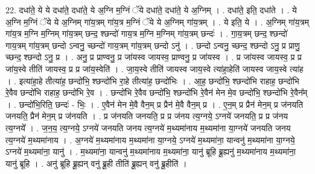 \documentclass[17pt]{extarticle}
\begin{document}
22. दधा॑ते॒ ये ये दधा॑ते॒ दधा॑ते॒ ये अ॒ग्नि म॒ग्निं ॅये दधा॑ते॒ दधा॑ते॒ ये अ॒ग्निम् । . दधा॑ते॒ इति॒ दधा॑ते । . ये अ॒ग्नि म॒ग्निं ॅये ये अ॒ग्निम् गा॑य॒त्रम् गा॑य॒त्र म॒ग्निं ॅये ये अ॒ग्निम् गा॑य॒त्रम् । . ये इति॒ ये । . अ॒ग्निम् गा॑य॒त्रम् गा॑य॒त्र म॒ग्नि म॒ग्निम् गा॑य॒त्रम् छन्द॒ श्छन्दो॑ गाय॒त्र म॒ग्नि म॒ग्निम् गा॑य॒त्रम् छन्दः॑ । . गा॒य॒त्रम् छन्द॒ श्छन्दो॑ गाय॒त्रम् गा॑य॒त्रम् छन्दो ऽन्वनु॒ च्छन्दो॑ गाय॒त्रम् गा॑य॒त्रम् छन्दो ऽनु॑ । . छन्दो ऽन्वनु॒ च्छन्द॒ श्छन्दो ऽनु॒ प्र प्राणु॒ च्छन्द॒ श्छन्दो ऽनु॒ प्र । . अनु॒ प्र प्राण्वनु॒ प्र जा॑यस्व जायस्व॒ प्राण्वनु॒ प्र जा॑यस्व । . प्र जा॑यस्व जायस्व॒ प्र प्र जा॑य॒स्वे तीति॑ जायस्व॒ प्र प्र जा॑य॒स्वेति॑ । . जा॒य॒स्वे तीति॑ जायस्व जाय॒स्वे त्या॑हा॒हेति॑ जायस्व जाय॒स्वे त्या॑ह । . इत्या॑हा॒हे तीत्या॑ह॒ छन्दो॑भि॒ श्छन्दो॑भि रा॒हे तीत्या॑ह॒ छन्दो॑भिः । . आ॒ह॒ छन्दो॑भि॒ श्छन्दो॑भि राहाह॒ छन्दो॑भि रे॒वैव छन्दो॑भि राहाह॒ छन्दो॑भि रे॒व । . छन्दो॑भि रे॒वैव छन्दो॑भि॒ श्छन्दो॑भि रे॒वैन॑ मेन मे॒व छन्दो॑भि॒ श्छन्दो॑भि रे॒वैन᳚म् । . छन्दो॑भि॒रिति॒ छन्दः॑ - भिः॒ । . ए॒वैन॑ मेन मे॒वै वैन॒म् प्र प्रैन॑ मे॒वै वैन॒म् प्र । . ए॒न॒म् प्र प्रैन॑ मेन॒म् प्र ज॑नयति जनयति॒ प्रैन॑ मेन॒म् प्र ज॑नयति । . प्र ज॑नयति जनयति॒ प्र प्र ज॑नय त्य॒ग्नये॒ ऽग्नये॑ जनयति॒ प्र प्र ज॑नय त्य॒ग्नये᳚ । . ज॒न॒य॒ त्य॒ग्नये॒ ऽग्नये॑ जनयति जनय त्य॒ग्नये॑ म॒थ्यमा॑नाय म॒थ्यमा॑ना या॒ग्नये॑ जनयति जनय त्य॒ग्नये॑ म॒थ्यमा॑नाय । . अ॒ग्नये॑ म॒थ्यमा॑नाय म॒थ्यमा॑ना या॒ग्नये॒ ऽग्नये॑ म॒थ्यमा॑ना॒ यान्वनु॑ म॒थ्यमा॑ना या॒ग्नये॒ ऽग्नये॑ म॒थ्यमा॑ना॒ यानु॑ । . म॒थ्यमा॑ना॒ यान्वनु॑ म॒थ्यमा॑नाय म॒थ्यमा॑ना॒ यानु॑ ब्रूहि ब्रू॒ह्यनु॑ म॒थ्यमा॑नाय म॒थ्यमा॑ना॒ यानु॑ ब्रूहि । . अनु॑ ब्रूहि ब्रू॒ह्यन् वनु॑ ब्रू॒ही तीति॑ ब्रू॒ह्यन् वनु॑ ब्रू॒हीति॑ । \newline
\end{document}
